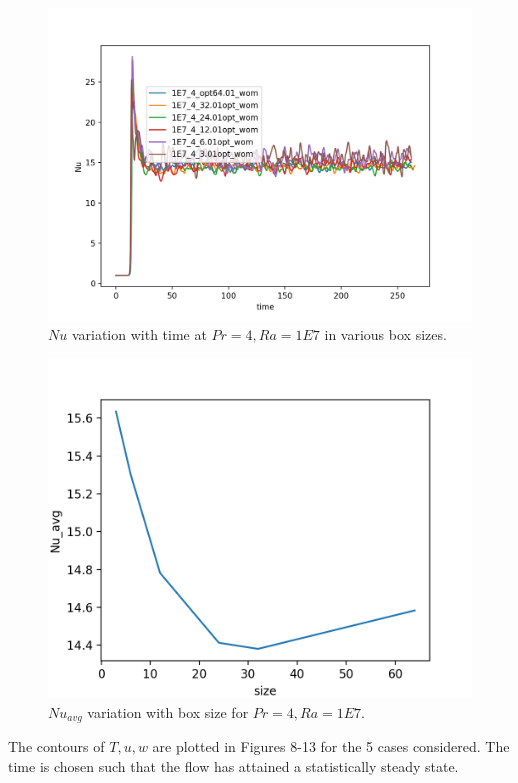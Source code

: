 \documentclass[12pt]{article}
\begin{document}
      \begin{figure}[!htb]
      	\includegraphics[width=\linewidth]{Nu_1E7_4.png}
      	\caption{$Nu$ variation with time at $Pr = 4, Ra = 1E7$ in various box sizes.}
      	\label{fig:fig6}
      \end{figure} 
      
      \begin{figure}[!htb]
      	\includegraphics[width=\linewidth]{Nu_avg_1E7_4.png}
      	\caption{$Nu_{avg}$ variation with box size for $Pr = 4, Ra = 1E7$.}
      	\label{fig:fig7}
      \end{figure} 
      
      The contours of $T,u,w$ are plotted in Figures 8-13 for the 5 cases considered. The time is chosen such that the flow has attained a statistically steady state.
      
\end{document}
